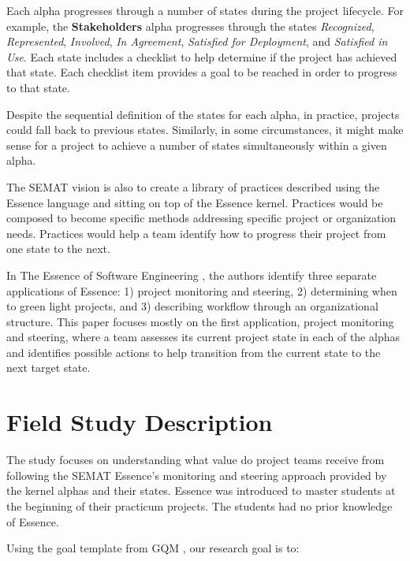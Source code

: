 Each alpha progresses through a number of states during the project lifecycle. For example, the \textbf{Stakeholders} alpha progresses through the states \textit{Recognized}, \textit{Represented}, \textit{Involved}, \textit{In Agreement}, \textit{Satisfied for Deployment}, and \textit{Satisfied in Use}. Each state includes a checklist to help determine if the project has achieved that state. Each checklist item provides a goal to be reached in order to progress to that state.

Despite the sequential definition of the states for each alpha, in practice, projects could fall back to previous states. Similarly, in some circumstances, it might make sense for a project to achieve a number of states simultaneously within a given alpha.

The SEMAT vision is also to create a library of practices described using the Essence language and sitting on top of the Essence kernel. Practices would be composed to become specific methods addressing specific project or organization needs. Practices would help a team identify how to progress their project from one state to the next.

In The Essence of Software Engineering \cite{EssenceBook}, the authors identify three separate applications of Essence: 1) project monitoring and steering, 2) determining when to green light projects, and 3) describing workflow through an organizational structure. This paper focuses mostly on the first application, project monitoring and steering, where a team assesses its current project state in each of the alphas and identifies possible actions to help transition from the current state to the next target state.

\section{Field Study Description}
\label{Field Study Description}

The study focuses on understanding what value do project teams receive from following the SEMAT Essence's monitoring and steering approach provided by the kernel alphas and their states. Essence was introduced to master students at the beginning of their practicum projects. The students had no prior knowledge of Essence.

Using the goal template from GQM \cite{GQM}, our research goal is to:

